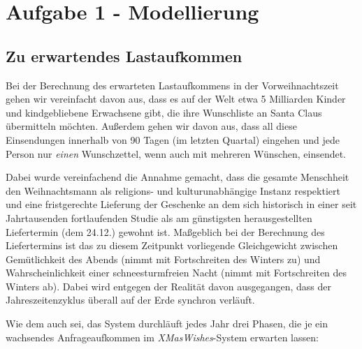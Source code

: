 \documentclass[12pt]{article}
\date{}
\begin{document}
	
\section*{Aufgabe 1 - Modellierung}
\subsection*{Zu erwartendes Lastaufkommen}
Bei der Berechnung des erwarteten Lastaufkommens in der Vorweihnachtszeit gehen wir vereinfacht davon aus, dass es auf der Welt etwa 5 Milliarden Kinder und kindgebliebene Erwachsene gibt, die ihre Wunschliste an Santa Claus übermitteln möchten.
Außerdem gehen wir davon aus, dass all diese Einsendungen innerhalb von 90 Tagen (im letzten Quartal) eingehen und jede Person nur \emph{einen} Wunschzettel, wenn auch mit mehreren Wünschen, einsendet.

Dabei wurde vereinfachend die Annahme gemacht, dass die gesamte Menschheit den Weihnachtsmann als religions- und kulturunabhängige Instanz respektiert und eine fristgerechte Lieferung der Geschenke an dem sich historisch in einer seit Jahrtausenden fortlaufenden Studie als am günstigsten herausgestellten Liefertermin (dem 24.12.) gewohnt ist.
Maßgeblich bei der Berechnung des Liefertermins ist das zu diesem Zeitpunkt vorliegende Gleichgewicht zwischen Gemütlichkeit des Abends (nimmt mit Fortschreiten des Winters zu) und Wahrscheinlichkeit einer schneesturmfreien Nacht (nimmt mit Fortschreiten des Winters ab).
Dabei wird entgegen der Realität davon ausgegangen, dass der Jahreszeitenzyklus überall auf der Erde synchron verläuft.

Wie dem auch sei, das System durchläuft jedes Jahr drei Phasen, die je ein wachsendes Anfrageaufkommen im \emph{XMasWishes}-System erwarten lassen:
\end{document}

